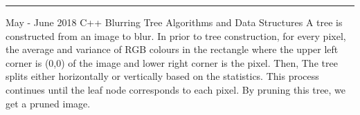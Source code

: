 \documentclass[11pt,a4paper,sans]{moderncv}
\begin{document}


\noindent\rule{\textwidth}{0.1pt}

    \vspace{3pt}
           
        \cventry
            {May - June 2018}
            {C++}   
            {Blurring Tree}
            {Algorithms and Data Structures}
            {}
            \hline
            {
                A tree is constructed from an image to blur. In prior to tree construction, 
                for every pixel, the average and variance of RGB colours in the rectangle 
                where the upper left corner is (0,0) of the image and lower right corner 
                is the pixel. Then, The tree splits either horizontally or vertically based 
                on the statistics. This process continues until the leaf node corresponds to 
                each pixel. By pruning this tree, we get a pruned image.
            }



\end{document}

